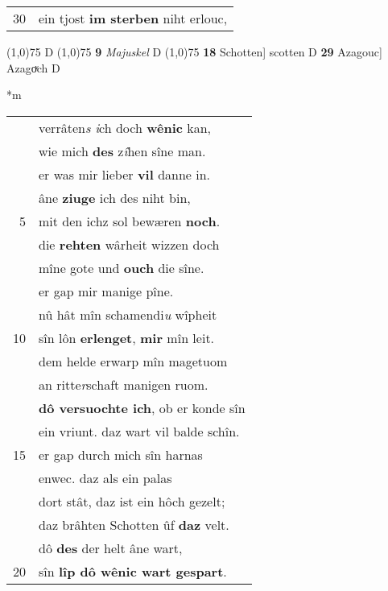 \documentclass[8pt,a4paper,notitlepage]{article}
\begin{document}
\begin{table}[ht]
\begin{minipage}[t]{0.5\linewidth}
\begin{tabular}{rl}
30 & ein tjost \textbf{im sterben} niht erlouc,\\ 
\end{tabular}
\scriptsize
\line(1,0){75} \newline
D \newline
\line(1,0){75} \newline
\textbf{9} \textit{Majuskel} D  \newline
\line(1,0){75} \newline
\textbf{18} Schotten] scotten D \textbf{29} Azagouc] Azagoͮch D \newline
\end{minipage}
\hspace{0.5cm}
\begin{minipage}[t]{0.5\linewidth}
\small
\begin{center}*m
\end{center}
\begin{tabular}{rl}
 & verrâten\textit{s i}ch doch \textbf{wênic} kan,\\ 
 & wie mich \textbf{des} z\textit{î}hen sîne man.\\ 
 & er was mir lieber \textbf{vil} danne in.\\ 
 & âne \textbf{ziuge} ich des niht bin,\\ 
5 & mit den ichz sol bewæren \textbf{noch}.\\ 
 & die \textbf{rehten} wârheit wizzen doch\\ 
 & mîne gote und \textbf{ouch} die sîne.\\ 
 & er gap mir manige pîne.\\ 
 & nû hât mîn schamendi\textit{u} wîpheit\\ 
10 & sîn lôn \textbf{erlenget}, \textbf{mir} mîn leit.\\ 
 & dem helde erwarp mîn magetuom\\ 
 & an ritte\textit{r}schaft manigen ruom.\\ 
 & \textbf{dô versuochte ich}, ob er konde sîn\\ 
 & ein vriunt. daz wart vil balde schîn.\\ 
15 & er gap durch mich sîn harnas\\ 
 & enwec. daz als ein palas\\ 
 & dort stât, daz ist ein hôch gezelt;\\ 
 & daz brâhten Schotten ûf \textbf{daz} velt.\\ 
 & dô \textbf{des} der helt âne wart,\\ 
20 & sîn \textbf{lîp dô wênic wart gespart}.\\ 

\end{tabular}
\end{minipage}
\end{table}
\end{document}
